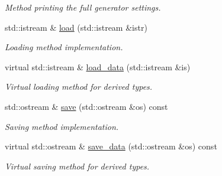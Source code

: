 \begin{DoxyCompactItemize}
\begin{DoxyCompactList}\small\item\em Method printing the full generator settings. \end{DoxyCompactList}\item 
\hypertarget{a00441_a3e7b2e301d82bfe11d7b37b2663e692b}{std\-::istream \& \hyperlink{a00441_a3e7b2e301d82bfe11d7b37b2663e692b}{load} (std\-::istream \&istr)}\label{a00441_a3e7b2e301d82bfe11d7b37b2663e692b}

\begin{DoxyCompactList}\small\item\em Loading method implementation. \end{DoxyCompactList}\item 
\hypertarget{a00441_a1a5227173fe7c8fba373680d81b25e3d}{virtual std\-::istream \& \hyperlink{a00441_a1a5227173fe7c8fba373680d81b25e3d}{load\-\_\-data} (std\-::istream \&is)}\label{a00441_a1a5227173fe7c8fba373680d81b25e3d}

\begin{DoxyCompactList}\small\item\em Virtual loading method for derived types. \end{DoxyCompactList}\item 
\hypertarget{a00441_a3742b76cbc8e96062bd3ba76bb4d5a38}{std\-::ostream \& \hyperlink{a00441_a3742b76cbc8e96062bd3ba76bb4d5a38}{save} (std\-::ostream \&os) const }\label{a00441_a3742b76cbc8e96062bd3ba76bb4d5a38}

\begin{DoxyCompactList}\small\item\em Saving method implementation. \end{DoxyCompactList}\item 
\hypertarget{a00441_a2cf186fa6b50db385a51bbe1fa517254}{virtual std\-::ostream \& \hyperlink{a00441_a2cf186fa6b50db385a51bbe1fa517254}{save\-\_\-data} (std\-::ostream \&os) const }\label{a00441_a2cf186fa6b50db385a51bbe1fa517254}

\begin{DoxyCompactList}\small\item\em Virtual saving method for derived types. \end{DoxyCompactList}\end{DoxyCompactItemize}
